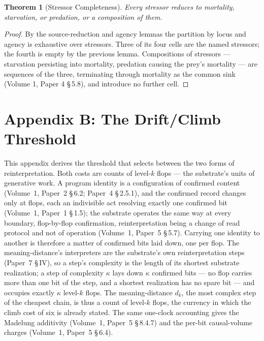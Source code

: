 \documentclass[11pt,oneside]{report}
\newtheorem{theorem}{Theorem}[section]
\theoremstyle{definition}
\theoremstyle{remark}
\begin{document}
\begin{theorem}[Stressor Completeness]
Every stressor reduces to mortality, starvation, or predation, or a composition of them.
\end{theorem}

\begin{proof}
By the source-reduction and agency lemmas the partition by locus and agency is exhaustive over stressors. Three of its four cells are the named stressors; the fourth is empty by the previous lemma. Compositions of stressors --- starvation persisting into mortality, predation causing the prey's mortality --- are sequences of the three, terminating through mortality as the common sink (Volume 1, Paper 4 \S\,5.8), and introduce no further cell.
\end{proof}

\section*{Appendix B: The Drift/Climb Threshold}

This appendix derives the threshold that selects between the two forms of reinterpretation. Both costs are counts of level-\ensuremath{k} flops --- the substrate's units of generative work. A program identity is a configuration of confirmed content (Volume~1, Paper~2 \S\,6.2; Paper~4 \S\,2.5.1), and the confirmed record changes only at flops, each an indivisible act resolving exactly one confirmed bit (Volume~1, Paper~1 \S\,1.5); the substrate operates the same way at every boundary, flop-by-flop confirmation, reinterpretation being a change of read protocol and not of operation (Volume~1, Paper~5 \S\,5.7). Carrying one identity to another is therefore a matter of confirmed bits laid down, one per flop. The meaning-distance's interpreters are the substrate's own reinterpretation steps (Paper~7 \S\,IV), so a step's complexity is the length of its shortest substrate realization; a step of complexity \ensuremath{\kappa} lays down \ensuremath{\kappa} confirmed bits --- no flop carries more than one bit of the step, and a shortest realization has no spare bit --- and occupies exactly \ensuremath{\kappa} level-\ensuremath{k} flops. The meaning-distance \ensuremath{d_k}, the most complex step of the cheapest chain, is thus a count of level-\ensuremath{k} flops, the currency in which the climb cost of six is already stated. The same one-clock accounting gives the Madelung additivity (Volume~1, Paper~5 \S\,8.4.7) and the per-bit causal-volume charges (Volume~1, Paper~5 \S\,6.4).
\end{document}
